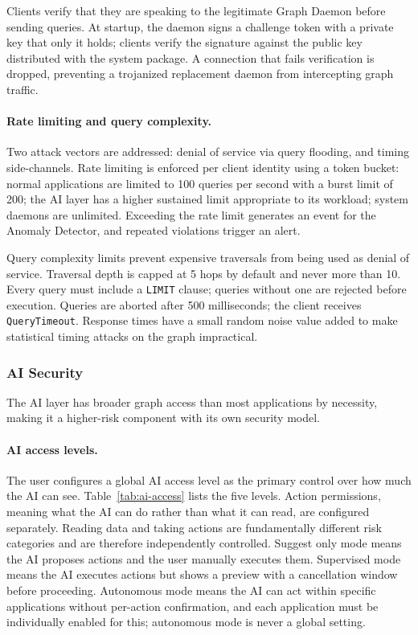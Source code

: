 Clients verify that they are speaking to the legitimate Graph Daemon before
sending queries. At startup, the daemon signs a challenge token with a private
key that only it holds; clients verify the signature against the public key
distributed with the system package. A connection that fails verification is
dropped, preventing a trojanized replacement daemon from intercepting graph
traffic.

\paragraph{Rate limiting and query complexity.}
Two attack vectors are addressed: denial of service via query flooding, and
timing side-channels. Rate limiting is enforced per client identity using a
token bucket: normal applications are limited to 100 queries per second with
a burst limit of 200; the AI layer has a higher sustained limit appropriate
to its workload; system daemons are unlimited. Exceeding the rate limit
generates an event for the Anomaly Detector, and repeated violations trigger
an alert.

Query complexity limits prevent expensive traversals from being used as denial
of service. Traversal depth is capped at 5 hops by default and never more than
10. Every query must include a \texttt{LIMIT} clause; queries without one are
rejected before execution. Queries are aborted after 500 milliseconds; the
client receives \texttt{QueryTimeout}. Response times have a small random
noise value added to make statistical timing attacks on the graph impractical.

\subsubsection{AI Security}
\label{sec:ai-security}

The AI layer has broader graph access than most applications by necessity,
making it a higher-risk component with its own security model.

\paragraph{AI access levels.}
The user configures a global AI access level as the primary control over how
much the AI can see. Table~\ref{tab:ai-access} lists the five levels. Action
permissions, meaning what the AI can do rather than what it can read, are
configured separately. Reading data and taking actions are fundamentally
different risk categories and are therefore independently controlled. Suggest
only mode means the AI proposes actions and the user manually executes them.
Supervised mode means the AI executes actions but shows a preview with a
cancellation window before proceeding. Autonomous mode means the AI can act
within specific applications without per-action confirmation, and each
application must be individually enabled for this; autonomous mode is never a
global setting.

